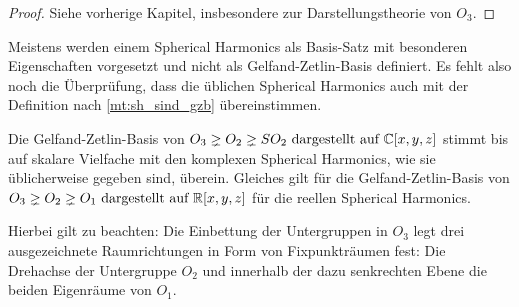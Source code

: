 \begin{proof}
	Siehe vorherige Kapitel, insbesondere zur Darstellungstheorie von $O_3$.
\end{proof}

\begin{remark}
	Meistens werden einem Spherical Harmonics als Basis-Satz mit besonderen Eigenschaften vorgesetzt und nicht als Gelfand-Zetlin-Basis definiert. Es fehlt also noch die Überprüfung, dass die üblichen Spherical Harmonics auch mit der Definition nach \ref{mt:sh_sind_gzb} übereinstimmen.
\end{remark}

\begin{lemma}
	Die Gelfand-Zetlin-Basis von $O_3\gneq O_2\gneq SO_2 \text{ dargestellt auf } \mathbb{C}[x,y,z]$ stimmt bis auf skalare Vielfache mit den komplexen Spherical Harmonics, wie sie üblicherweise gegeben sind, überein. Gleiches gilt für die Gelfand-Zetlin-Basis von $O_3\gneq O_2\gneq O_1 \text{ dargestellt auf } \mathbb{R}[x,y,z]$ für die reellen Spherical Harmonics.

	Hierbei gilt zu beachten: Die Einbettung der Untergruppen in $O_3$ legt drei ausgezeichnete Raumrichtungen in Form von Fixpunkträumen fest: Die Drehachse der Untergruppe $O_2$ und innerhalb der dazu senkrechten Ebene die beiden Eigenräume von $O_1$.
\end{lemma}
